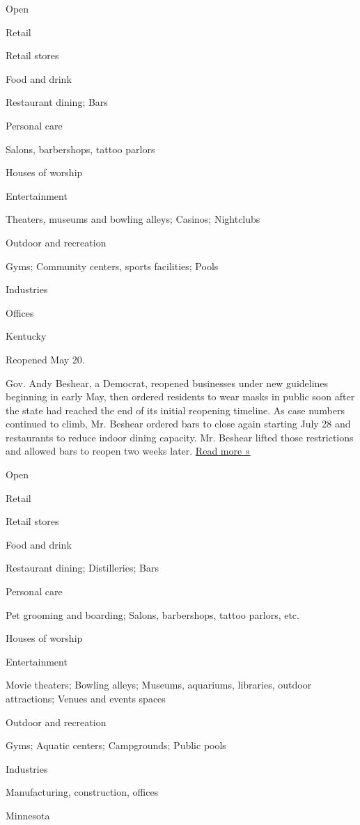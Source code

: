 Open

Retail

Retail stores

Food and drink

Restaurant dining; Bars

Personal care

Salons, barbershops, tattoo parlors

Houses of worship

Entertainment

Theaters, museums and bowling alleys; Casinos; Nightclubs

Outdoor and recreation

Gyms; Community centers, sports facilities; Pools

Industries

Offices

Kentucky

Reopened May 20.

Gov. Andy Beshear, a Democrat, reopened businesses under new guidelines
beginning in early May, then ordered residents to wear masks in public
soon after the state had reached the end of its initial reopening
timeline. As case numbers continued to climb, Mr. Beshear ordered bars
to close again starting July 28 and restaurants to reduce indoor dining
capacity. Mr. Beshear lifted those restrictions and allowed bars to
reopen two weeks later.
\href{https://www.rcnky.com/articles/2020/08/10/governor-delay-person-school-until-sept-28-bars-reopen-restaurants-expand}{Read
more »}

Open

Retail

Retail stores

Food and drink

Restaurant dining; Distilleries; Bars

Personal care

Pet grooming and boarding; Salons, barbershops, tattoo parlors, etc.

Houses of worship

Entertainment

Movie theaters; Bowling alleys; Museums, aquariums, libraries, outdoor
attractions; Venues and events spaces

Outdoor and recreation

Gyms; Aquatic centers; Campgrounds; Public pools

Industries

Manufacturing, construction, offices

Minnesota

